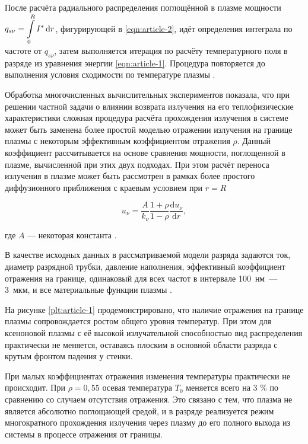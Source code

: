 После расчёта радиального распределения поглощённой в плазме мощности $\displaystyle q_{s\nu} = \int\displaylimits_0^R I^* \,\mathrm dr$, фигурирующей в \eqref{eqn:article-2}, идёт определения интеграла по частоте от $q_{s\nu}$, затем выполняется итерация по расчёту температурного поля в разряде из уравнения энергии \eqref{eqn:article-1}.
Процедура повторяется до выполнения условия сходимости по температуре плазмы \cite{article-5-kalitkin}.

Обработка многочисленных вычислительных экспериментов \cite{gradov-dissertation, article-6-gradov} показала, что при решении частной задачи о влиянии возврата излучения на его теплофизические характеристики сложная процедура расчёта прохождения излучения в системе может быть заменена более простой моделью отражении излучения на границе плазмы с некоторым эффективным коэффициентом отражения $\rho$.
Данный коэффициент рассчитывается на основе сравнения мощности, поглощенной в плазме, вычисленной при этих двух подходах.
При этом расчёт переноса излучения в плазме может быть рассмотрен в рамках более простого диффузионного приближения \cite{gradov-dissertation, article-6-gradov, article-7-zeldovich} с краевым условием при $r = R$

\begin{equation}
	u_\nu = \frac{A}{k_\nu} \frac{1 + \rho}{1 - \rho} \frac{\mathrm du_\nu}{\mathrm dr},
\end{equation}

\noindent где $A$ — некоторая константа \cite{gradov-dissertation, article-6-gradov}.

В качестве исходных данных в рассматриваемой модели разряда задаются ток, диаметр разрядной трубки, давление наполнения, эффективный коэффициент отражения на границе, одинаковый для всех частот в интервале 100~нм~— 3~мкм, и все материальные функции плазмы \cite{article-8-gradov, article-9-gradov}.

На рисунке \ref{plt:article-1} продемонстрировано, что наличие отражения на границе плазмы сопровождается ростом общего уровня температур.
При этом для ксеноновой плазмы с её высокой излучательной способностью вид распределения практически не меняется, оставаясь плоским в основной области разряда с крутым фронтом падения у стенки.

При малых коэффициентах отражения изменения температуры практически не происходит.
При $\rho = 0,55$ осевая температура $T_0$ меняется всего на 3 \% по сравнению со случаем отсутствия отражения.
Это связано с тем, что плазма не является абсолютно поглощающей средой, и в разряде реализуется режим многократного прохождения излучения через плазму до его полного выхода из системы в процессе отражения от границы.

